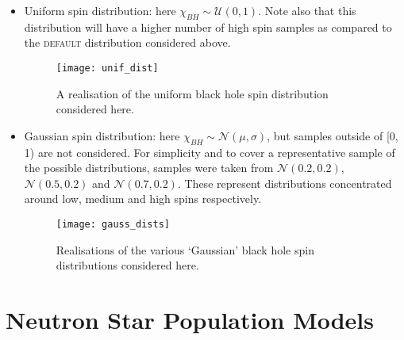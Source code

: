         \begin{itemize}

            \item Uniform spin distribution: here $\chi_{BH} \sim \mathcal{U}(0, 1)$.
                Note also that this distribution will have a higher number of high spin
                samples as compared to the \textsc{default} distribution considered
                above.

                \begin{figure}[H]
                    \centering
                    \texttt{[image: unif\_dist]}
                    \caption[Uniform Black Hole Spin Distribution]{
                        A realisation of the uniform black hole spin distribution
                        considered here.
                    }
                    \label{fig:unif_dist}
                \end{figure}

            \item Gaussian spin distribution: here $\chi_{BH} \sim \mathcal{N}(\mu,
                \sigma)$, but samples outside of [0, 1) are not considered. For
                simplicity and to cover a representative sample of the possible
                distributions, samples were taken from $\mathcal{N}(0.2, 0.2)$,
                $\mathcal{N}(0.5, 0.2)$ and $\mathcal{N}(0.7, 0.2)$. These represent
                distributions concentrated around low, medium and high spins
                respectively.

                \begin{figure}[H]
                    \centering
                    \texttt{[image: gauss\_dists]}
                    \caption[Gaussian Black Hole Spin Distributions]{
                        Realisations of the various `Gaussian' black hole spin
                        distributions considered here.
                    }
                    \label{fig:gauss_dists}
                \end{figure}

        \end{itemize}


\section{Neutron Star Population Models}\label{sec:ns_pop}

